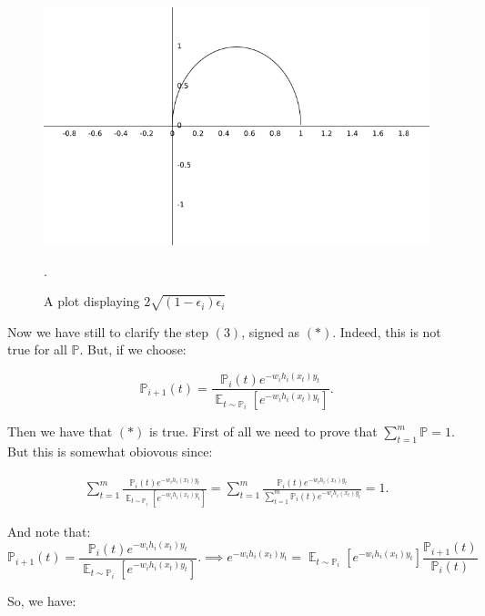 \documentclass{article}
\DeclareMathOperator{\E}{\mathbb{E}}
\begin{document}
\begin{figure}
  \includegraphics[width=\linewidth]{../images/x(x-1).png}
  \caption{A plot displaying $2\sqrt{(1-\epsilon_i)\epsilon_i}$}.
  \label{fig:x(x-1)}
\end{figure}

Now we have still to clarify the step $(3)$, signed as $(*)$. Indeed, this is not true for all $\mathbb{P}$.
But, if we choose:

$$
\mathbb{P}_{i+1}(t) = \frac{\mathbb{P}_{i}(t)e^{-w_i h_i(x_t) y_t}}{\E_{t\sim \mathbb{P}_i} [ e^{-w_i h_i(x_t) y_t} ]}.
$$

Then we have that $(*)$ is true. First of all we need to prove that $\sum_{t=1}^{m} \mathbb{P} = 1$.
But this is somewhat obiovous since:

\begin{align*}
\sum_{t=1}^{m} \frac{\mathbb{P}_{i}(t)e^{-w_i h_i(x_t) y_t}}{\E_{t\sim \mathbb{P}_i} [ e^{-w_i h_i(x_t) y_t} ]} = 
\sum_{t=1}^{m} \frac{\mathbb{P}_{i}(t)e^{-w_i h_i(x_t) y_t}}{\sum_{t=1}^{m} \mathbb{P}_i(t) e^{-w_i h_i(x_t) y_t} } = 
1.
\end{align*}

And note that:
$$
\mathbb{P}_{i+1}(t) = \frac{\mathbb{P}_{i}(t)e^{-w_i h_i(x_t) y_t}}{\E_{t\sim \mathbb{P}_i} [ e^{-w_i h_i(x_t) y_t} ]}.
\implies e^{-w_i h_i(x_t) y_t} = \E_{t\sim \mathbb{P}_i} [ e^{-w_i h_i(x_t) y_t} ] \frac{\mathbb{P}_{i+1}(t)}{\mathbb{P}_{i}(t)}
$$

So, we have:
\end{document}
